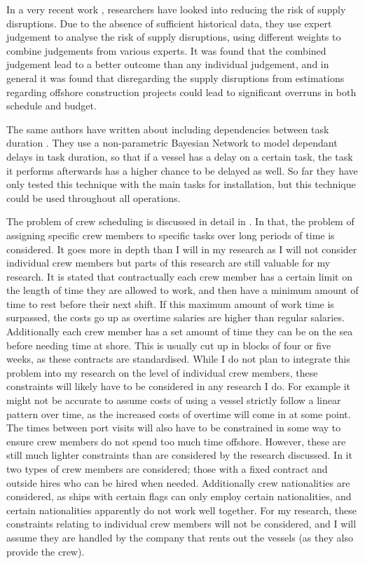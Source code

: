 \documentclass[a4paper,12pt]{article}
\begin{document}
\bigskip

In a very recent work \cite{leontaris2019decision}, researchers have looked into reducing the risk of supply disruptions. Due to the absence of sufficient historical data, they use expert judgement to analyse the risk of supply disruptions, using different weights to combine judgements from various experts. It was found that the combined judgement lead to a better outcome than any individual judgement, and in general it was found that disregarding the supply disruptions from estimations regarding offshore construction projects could lead to significant overruns in both schedule and budget. 

The same authors have written about including dependencies between task duration \cite{leontaris2016probabilistic}. They use a non-parametric Bayesian Network to model dependant delays in task duration, so that if a vessel has a delay on a certain task, the task it performs afterwards has a higher chance to be delayed as well. So far they have only tested this technique with the main tasks for installation, but this technique could be used throughout all operations. 

\bigskip

The problem of crew scheduling is discussed in detail in \cite{leggate2010crew}. In that, the problem of assigning specific crew members to specific tasks over long periods of time is considered. It goes more in depth than I will in my research as I will not consider individual crew members but parts of this research are still valuable for my research. It is stated that contractually each crew member has a certain limit on the length of time they are allowed to work, and then have a minimum amount of time to rest before their next shift. If this maximum amount of work time is surpassed, the costs go up as overtime salaries are higher than regular salaries. Additionally each crew member has a set amount of time they can be on the sea before needing time at shore. This is usually cut up in blocks of four or five weeks, as these contracts are standardised. While I do not plan to integrate this problem into my research on the level of individual crew members, these constraints will likely have to be considered in any research I do. For example it might not be accurate to assume costs of using a vessel strictly follow a linear pattern over time, as the increased costs of overtime will come in at some point. The times between port visits will also have to be constrained in some way to ensure crew members do not spend too much time offshore. However, these are still much lighter constraints than are considered by the research discussed. In it two types of crew members are considered; those with a fixed contract and outside hires who can be hired when needed. Additionally crew nationalities are considered, as ships with certain flags can only employ certain nationalities, and certain nationalities apparently do not work well together. For my research, these constraints relating to individual crew members will not be considered, and I will assume they are handled by the company that rents out the vessels (as they also provide the crew). 
\end{document}
